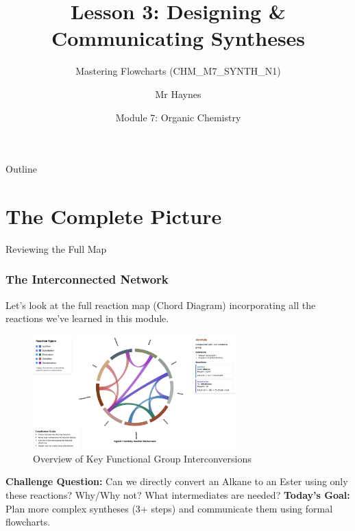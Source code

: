 \documentclass[xcolor=svgnames]{beamer}
\title[Org Chem: Designing Syntheses]{Lesson 3: Designing \& Communicating Syntheses}
\subtitle{Mastering Flowcharts (CHM\_M7\_SYNTH\_N1)}
\author[P. Haynes]{Mr Haynes} %
\institute[GHS]{Gosford High School}
\date{Module 7: Organic Chemistry}
\begin{document}
\begin{frame}
    \titlepage
\end{frame}

\begin{frame}{Outline}
    \tableofcontents
\end{frame}

\section{The Complete Picture}
\begin{frame}{Reviewing the Full Map}
    \frametitle{The Interconnected Network}
    Let's look at the full reaction map (Chord Diagram) incorporating all the reactions we've learned in this module.
    \vspace{1em}
    \begin{figure}
        \includegraphics[width=0.7\textwidth]{img/all-organic-chem.png}
        \caption{Overview of Key Functional Group Interconversions}
    \end{figure}
    \vspace{1em}
    \textbf{Challenge Question:} Can we directly convert an Alkane to an Ester using only these reactions? Why/Why not? What intermediates are needed?
    \vspace{1em}
    \textbf{Today's Goal:} Plan more complex syntheses (3+ steps) and communicate them using formal flowcharts.
\end{frame}
\end{document}
